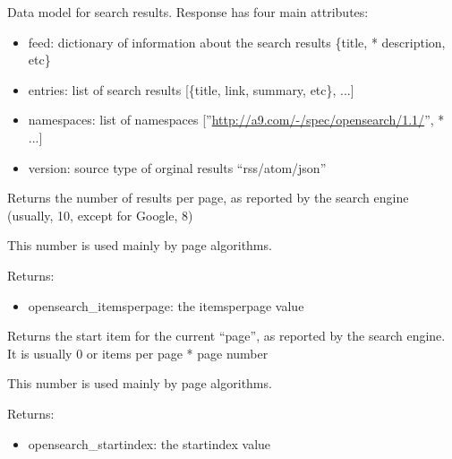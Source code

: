 \documentclass[letterpaper,10pt,english]{sphinxmanual}
\begin{document}
\begin{fulllineitems}
\label{api3.0:puppy.model.Response}
Data model for search results.  Response has four main attributes:
\begin{itemize}
\item {} 
feed: dictionary of information about the search results \{title,
* description, etc\}

\item {} 
entries: list of search results {[}\{title, link, summary, etc\}, ...{]}

\item {} 
namespaces: list of namespaces {[}''\href{http://a9.com/-/spec/opensearch/1.1/}{http://a9.com/-/spec/opensearch/1.1/}'',
* ...{]}

\item {} 
version: source type of orginal results ``rss/atom/json''

\end{itemize}

\begin{fulllineitems}
\label{api3.0:puppy.model.Response.get_itemsperpage}
Returns the number of results per page, as reported by the search engine (usually, 10, except for Google, 8)

This number is used mainly by page algorithms.

Returns:
\begin{itemize}
\item {} 
opensearch\_itemsperpage: the itemsperpage value

\end{itemize}

\end{fulllineitems}


\begin{fulllineitems}
\label{api3.0:puppy.model.Response.get_startindex}
Returns the start item for the current ``page'', as reported by the search engine. It is usually 0 or items per page * page number

This number is used mainly by page algorithms.

Returns:
\begin{itemize}
\item {} 
opensearch\_startindex: the startindex value


\end{itemize}
\end{fulllineitems}
\end{fulllineitems}
\end{document}
